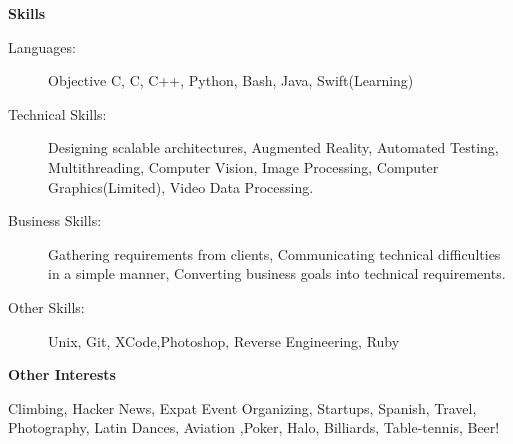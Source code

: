\documentclass[letterpaper,11pt]{article}
\newcommand{\resheading}[1]{{\large \colorbox{mygrey}{\begin{minipage}{\textwidth}{\textbf{#1 \vphantom{p\^{E}}}}\end{minipage}}}}
\begin{document}
\resheading{Skills}
\begin{description}
\item[Languages:]
Objective C, C, C++, Python, Bash, Java, Swift(Learning)
\item[Technical Skills:]
Designing scalable architectures, Augmented Reality, Automated Testing, Multithreading, Computer Vision, Image Processing, Computer Graphics(Limited), Video Data Processing.  
\item[Business Skills:]
Gathering requirements from clients, Communicating technical difficulties in a simple manner, Converting business goals into technical requirements.
\item[Other Skills:]
Unix, Git, XCode,Photoshop, Reverse Engineering, Ruby
\end{description}


\resheading{Other Interests}
\begin{description}
\item Climbing, Hacker News, Expat Event Organizing, Startups, Spanish, Travel, Photography, Latin Dances, Aviation ,Poker, Halo, Billiards, Table-tennis, Beer!
\end{description}
\end{document}
